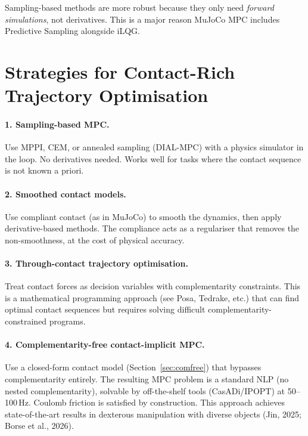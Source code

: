 \documentclass[11pt,twoside]{report}
\theoremstyle{definition}
\theoremstyle{plain}
\theoremstyle{remark}
\newcommand{\0}{\bm{0}}
\begin{document}
Sampling-based methods are more robust because they only need
\emph{forward simulations}, not derivatives.  This is a major reason
MuJoCo MPC includes Predictive Sampling alongside iLQG.

\section{Strategies for Contact-Rich Trajectory Optimisation}

\paragraph{1. Sampling-based MPC.}
Use MPPI, CEM, or annealed sampling (DIAL-MPC) with a physics
simulator in the loop.  No derivatives needed.
Works well for tasks where the contact sequence is not known a priori.

\paragraph{2. Smoothed contact models.}
Use compliant contact (as in MuJoCo) to smooth the dynamics, then
apply derivative-based methods.  The compliance acts as a regulariser
that removes the non-smoothness, at the cost of physical accuracy.

\paragraph{3. Through-contact trajectory optimisation.}
Treat contact forces as decision variables with complementarity
constraints.  This is a mathematical programming approach
(see Posa, Tedrake, etc.) that can find optimal contact sequences
but requires solving difficult complementarity-constrained programs.

\paragraph{4. Complementarity-free contact-implicit MPC.}
Use a closed-form contact model (Section~\ref{sec:comfree}) that bypasses
complementarity entirely.  The resulting MPC problem is a standard NLP
(no nested complementarity), solvable by off-the-shelf tools (CasADi/IPOPT)
at 50--100\,Hz.  Coulomb friction is satisfied by construction.
This approach achieves state-of-the-art results in dexterous manipulation
with diverse objects (Jin, 2025; Borse et al., 2026).
\end{document}
